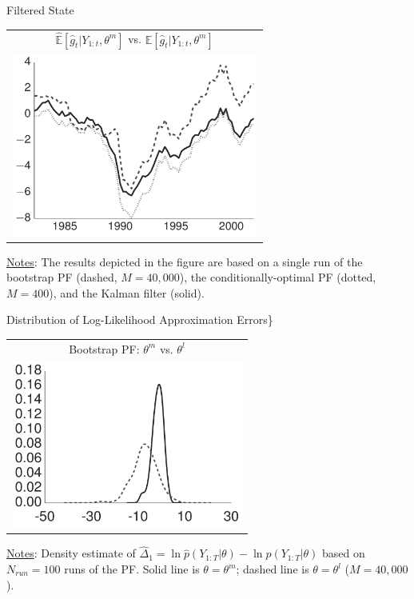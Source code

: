 \documentclass[presentation]{beamer}
\begin{document}
\begin{frame}[label={sec:orgc4b6f0a}]{Filtered State}
\begin{center}
	\begin{tabular}{c}
		$\widehat{\mathbb{E}}[\hat{g}_t|Y_{1:t},\theta^m]$ vs. $\mathbb{E}[\hat{g}_t|Y_{1:t},\theta^m]$\\
		\includegraphics[width=3.2in]{dsge1_me_paramax_ghat.pdf}
	\end{tabular}
\end{center}
\uline{Notes}: The results depicted in the figure are based on a single run
of the bootstrap PF (dashed, \(M=40,000\)), the conditionally-optimal PF (dotted, \(M=400\)), and the Kalman filter (solid).
\end{frame}

\begin{frame}[label={sec:orgbad312c}]{Distribution of Log-Likelihood Approximation Errors\}}
\begin{center}
	\begin{tabular}{c}
		Bootstrap PF: $\theta^m$ vs. $\theta^l$ \\
		\includegraphics[width=3in]{dsge1_me_bootstrap_lnlhbias.pdf}
	\end{tabular}
\end{center}
\uline{Notes}: Density estimate of \(\hat{\Delta}_1 = \ln \hat{p}(Y_{1:T}|\theta)- \ln p(Y_{1:T}|\theta)\)
based on \(N_{run}=100\) runs of the PF. Solid line is \(\theta = \theta^m\); dashed line is \(\theta = \theta^l\) 
(\(M=40,000\)).
\end{frame}
\end{document}
